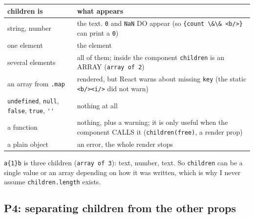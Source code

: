 {\def\LTcaptype{none} %
\begin{longtable}[]{@{}
  >{\raggedright\arraybackslash}p{}
  >{\raggedright\arraybackslash}p{}@{}}
\toprule\noalign{}
\begin{minipage}[b]{\linewidth}\raggedright
children is
\end{minipage} & \begin{minipage}[b]{\linewidth}\raggedright
what appears
\end{minipage} \\
\midrule\noalign{}
\endhead
\bottomrule\noalign{}
\endlastfoot
string, number & the text. \passthrough{\lstinline!0!} and \passthrough{\lstinline!NaN!} DO appear (so \passthrough{\lstinline!\{count \&\& <b/>\}!} can print a \passthrough{\lstinline!0!}) \\
one element & the element \\
several elements & all of them; inside the component \passthrough{\lstinline!children!} is an ARRAY (\passthrough{\lstinline!array of 2!}) \\
an array from \passthrough{\lstinline!.map!} & rendered, but React warns about missing \passthrough{\lstinline!key!} (the static \passthrough{\lstinline!<b/><i/>!} did not warn) \\
\passthrough{\lstinline!undefined!}, \passthrough{\lstinline!null!}, \passthrough{\lstinline!false!}, \passthrough{\lstinline!true!}, \passthrough{\lstinline!''!} & nothing at all \\
a function & nothing, plus a warning; it is only useful when the component CALLS it (\passthrough{\lstinline!children(free)!}, a render prop) \\
a plain object & an error, the whole render stops \\
\end{longtable}
}

\passthrough{\lstinline!a\{1\}b!} is three children (\passthrough{\lstinline!array of 3!}): text, number, text. So \passthrough{\lstinline!children!} can be a single value or an array
depending on how it was written, which is why I never assume \passthrough{\lstinline!children.length!} exists.

\subsection{P4: separating children from the other props}\label{p4-separating-children-from-the-other-props}

